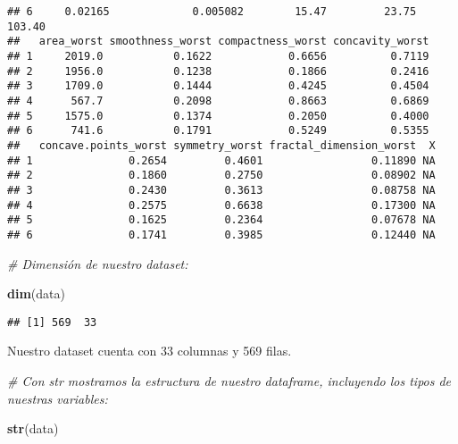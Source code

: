 \documentclass[
]{article}
\newenvironment{Shaded}{\begin{snugshade}}{\end{snugshade}}
\newcommand{\CommentTok}[1]{\textcolor[rgb]{0.56,0.35,0.01}{\textit{#1}}}
\newcommand{\FunctionTok}[1]{\textcolor[rgb]{0.13,0.29,0.53}{\textbf{#1}}}
\newcommand{\NormalTok}[1]{#1}
\begin{document}
\begin{verbatim}
## 6     0.02165             0.005082        15.47         23.75          103.40
##   area_worst smoothness_worst compactness_worst concavity_worst
## 1     2019.0           0.1622            0.6656          0.7119
## 2     1956.0           0.1238            0.1866          0.2416
## 3     1709.0           0.1444            0.4245          0.4504
## 4      567.7           0.2098            0.8663          0.6869
## 5     1575.0           0.1374            0.2050          0.4000
## 6      741.6           0.1791            0.5249          0.5355
##   concave.points_worst symmetry_worst fractal_dimension_worst  X
## 1               0.2654         0.4601                 0.11890 NA
## 2               0.1860         0.2750                 0.08902 NA
## 3               0.2430         0.3613                 0.08758 NA
## 4               0.2575         0.6638                 0.17300 NA
## 5               0.1625         0.2364                 0.07678 NA
## 6               0.1741         0.3985                 0.12440 NA
\end{verbatim}

\begin{Shaded}
\begin{Highlighting}[]
\CommentTok{\# Dimensión de nuestro dataset:}

\FunctionTok{dim}\NormalTok{(data)}
\end{Highlighting}
\end{Shaded}

\begin{verbatim}
## [1] 569  33
\end{verbatim}

Nuestro dataset cuenta con 33 columnas y 569 filas.

\begin{Shaded}
\begin{Highlighting}[]
\CommentTok{\# Con str mostramos la estructura de nuestro dataframe, incluyendo los tipos de nuestras variables:}

\FunctionTok{str}\NormalTok{(data)}
\end{Highlighting}
\end{Shaded}
\end{document}
